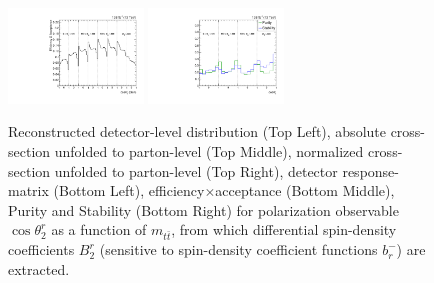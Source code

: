 \begin{figure}[htb]
\begin{center}
 \includegraphics[width=0.32\textwidth]{fig_fullRun2UL/unfolding/combined/TotEff_b2r_mttbar.pdf}
 \includegraphics[width=0.32\textwidth]{fig_fullRun2UL/unfolding/combined/PurStab_b2r_mttbar.pdf} \\
\caption{Reconstructed detector-level distribution (Top Left), absolute cross-section unfolded to parton-level (Top Middle), normalized cross-section unfolded to parton-level (Top Right), detector response-matrix (Bottom Left), efficiency$\times$acceptance (Bottom Middle), Purity and Stability (Bottom Right) for polarization observable $\cos\theta_{2}^{r}$ as a function of $m_{t\bar{t}}$, from which differential spin-density coefficients $B_{2}^{r}$ (sensitive to spin-density coefficient functions $b_r^{-}$) are extracted.}
\label{fig:b2r_mttbar}
\end{center}
\end{figure}
\clearpage
